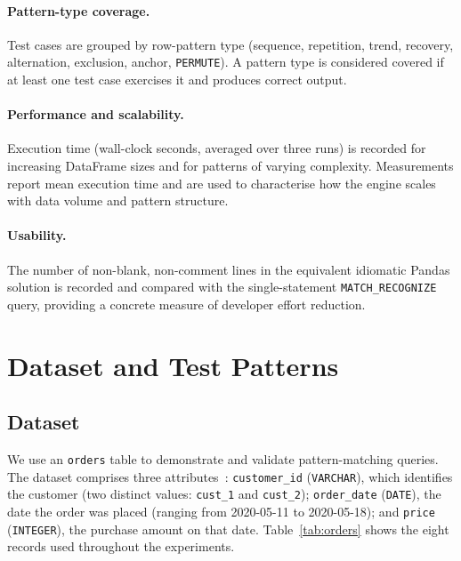 \paragraph{Pattern-type coverage.}
Test cases are grouped by row-pattern type
(sequence, repetition, trend, recovery, alternation, exclusion,
anchor, \texttt{PERMUTE}).  A pattern type is considered covered
if at least one test case exercises it and produces correct output.

\paragraph{Performance and scalability.}
Execution time (wall-clock seconds, averaged over three runs) is
recorded for increasing DataFrame sizes and for patterns of
varying complexity.  Measurements report mean execution time and
are used to characterise how the engine scales with data volume
and pattern structure.

\paragraph{Usability.}
The number of non-blank, non-comment lines in the equivalent
idiomatic Pandas solution is recorded and compared with the
single-statement \texttt{MATCH\_RECOGNIZE} query, providing a
concrete measure of developer effort reduction.

\section{Dataset and Test Patterns}
\label{sec:eval-dataset}

\subsection{Dataset}
\label{subsec:eval-dataset-orders}

We use an \texttt{orders} table to demonstrate and validate
pattern-matching queries.  The dataset comprises three
attributes~\cite{trino2021row}: \texttt{customer\_id}
(\texttt{VARCHAR}), which identifies the customer (two distinct
values: \texttt{cust\_1} and \texttt{cust\_2});
\texttt{order\_date} (\texttt{DATE}), the date the order was placed
(ranging from 2020-05-11 to 2020-05-18); and \texttt{price}
(\texttt{INTEGER}), the purchase amount on that date.
Table~\ref{tab:orders} shows the eight records used throughout the
experiments.

